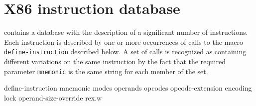 \chapter{X86 instruction database}

\sysname contains a database with the description of a significant
number of instructions.  Each instruction is described by one or more
occurrences of calls to the macro \texttt{define-instruction}
described below.  A set of calls is recognized as containing different
variations on the same instruction by the fact that the required
parameter \texttt{mnemonic} is the same string for each member of the
set.

 define-instruction {mnemonic \key 
				       modes
				       operands
				       opcodes
				       opcode-extension
				       encoding
				       lock
				       operand-size-override
				       rex.w}
